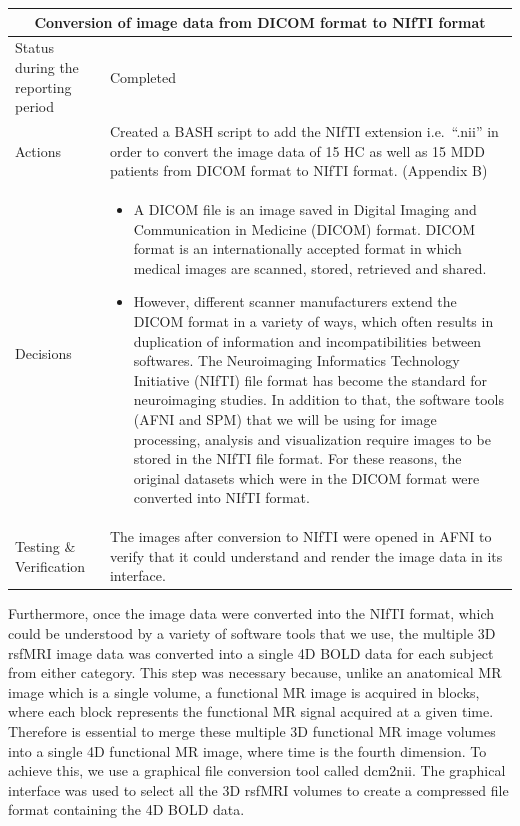 \documentclass[12pt]{article}
\begin{document}
\begin{table}[H]
  \centering
  \begin{tabular} {| m{3.3cm} | m{11.5cm} | }
    \hline
    \multicolumn{2}{|c|}{Conversion of image data from DICOM format to
    NIfTI format} \\ \hline
    Status during the reporting period   & Completed   \\ \hline
    Actions &
    Created a BASH script to add the NIfTI extension i.e.~``.nii'' in
    order to convert the image data of 15 HC as well as 15 MDD
    patients from DICOM format to NIfTI format. (Appendix B) \\ \hline

    Decisions &
    \begin{itemize}

      \item A DICOM file is an image saved in Digital Imaging and
        Communication in Medicine (DICOM) format.  DICOM format is an
        internationally accepted format in which medical images are
        scanned, stored, retrieved and shared.

      \item However, different scanner manufacturers extend the DICOM
        format in a variety of ways, which often results in
        duplication of information and incompatibilities between
        softwares. The Neuroimaging Informatics Technology Initiative
        (NIfTI) file format has become the standard for neuroimaging
        studies. In addition to that, the software tools (AFNI and
        SPM) that we will be using for image processing, analysis and
        visualization require images to be stored in the NIfTI file
        format. For these reasons, the original datasets which were in
        the DICOM format were converted into NIfTI format.

    \end{itemize} \\ \hline

    Testing \& Verification &
    The images after conversion to NIfTI were opened in AFNI to verify
    that it could understand and render the image data in its
    interface. \\

    \hline

  \end{tabular}
\end{table}

Furthermore, once the image data were converted into the NIfTI format,
which could be understood by a variety of software tools that we use,
the multiple 3D rsfMRI image data was converted into a single 4D BOLD
data for each subject from either category. This step was necessary
because, unlike an anatomical MR image which is a single volume, a
functional MR image is acquired in blocks, where each block represents
the functional MR signal acquired at a given time. Therefore is
essential to merge these multiple 3D functional MR image volumes into
a single 4D functional MR image, where time is the fourth dimension.
To achieve this, we use a graphical file conversion tool called
dcm2nii. The graphical interface was used to select all the 3D rsfMRI
volumes to create a compressed file format containing the 4D BOLD
data.
\end{document}
